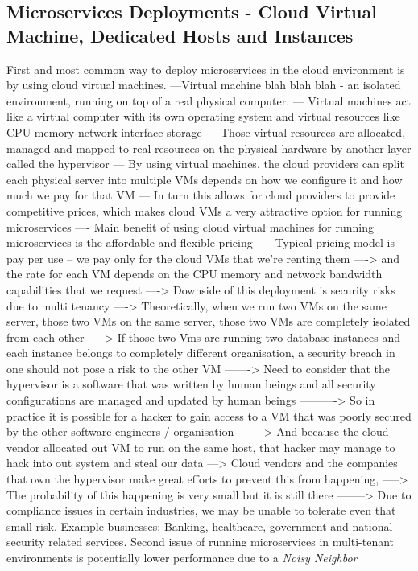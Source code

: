 \documentclass[a4paper, 11pt]{book}
\begin{document}
{    \subsection{Microservices Deployments - Cloud Virtual Machine, Dedicated Hosts and Instances}
    First and most common way to deploy microservices in the cloud environment is by using cloud virtual machines.
    ---Virtual machine blah blah blah - an isolated environment, running on top of a real physical computer.
    --- Virtual machines act like a virtual computer with its own operating system and virtual resources like CPU memory network interface storage
    --- Those virtual resources are allocated, managed and mapped to real resources on the physical hardware by another layer called the hypervisor
    --- By using virtual machines, the cloud providers can split each physical server into multiple VMs depends on how we configure it and how much we pay for that VM
    --- In turn this allows for cloud providers to provide competitive prices, which makes cloud VMs a very attractive option for running microservices
    ---- Main benefit of using cloud virtual machines for running microservices is the affordable and flexible pricing
    ---- Typical pricing model is pay per use -- we pay only for the cloud VMs that we're renting them
    ----> and the rate for each VM depends on the CPU memory and network bandwidth capabilities that we request
    ----> Downside of this deployment is security risks due to multi tenancy
    ----> Theoretically, when we run two VMs on the same server, those two VMs on the same server, those two VMs are completely isolated from each other
    -----> If those two Vms are running two database instances and each instance belongs to completely different organisation, a security breach in one should not pose a risk to the other VM
    -------> Need to consider that the hypervisor is a software that was written by human beings and all security configurations are managed and updated by human beings
    ----------> So in practice it is possible for a hacker to gain access to a VM that was poorly secured by the other software engineers / organisation
    -------> And because the cloud vendor allocated out VM to run on the same host, that hacker may manage to hack into out system and steal our data
    ---> Cloud vendors and the companies that own the hypervisor make great efforts to prevent this from happening,
    -----> The probability of this happening is very small but it is still there
    --------> Due to compliance issues in certain industries, we may be unable to tolerate even that small risk.
    Example businesses: Banking, healthcare, government and national security related services.
    Second issue of running microservices in multi-tenant environments is potentially lower performance due to a \textit{Noisy Neighbor}

}
\end{document}

